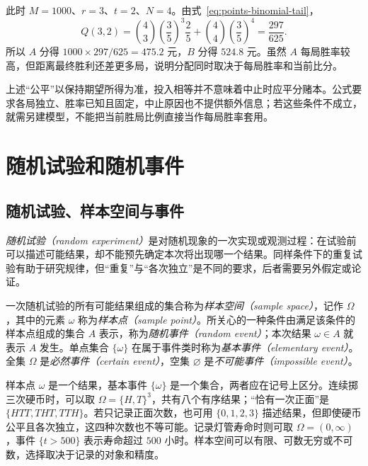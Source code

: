 \begin{solve}
此时 $M=1000$、$r=3$、$t=2$、$N=4$。由式~\eqref{eq:points-binomial-tail}，
\[
  Q(3,2)=\binom43\left(\frac35\right)^3\frac25
          +\binom44\left(\frac35\right)^4
        =\frac{297}{625}.
\]
所以 $A$ 分得 $1000\times297/625=475.2$ 元，$B$ 分得 $524.8$ 元。虽然 $A$ 每局胜率较高，但距离最终胜利还差更多局，说明分配同时取决于每局胜率和当前比分。
\end{solve}

上述“公平”以保持期望所得为准，投入相等并不意味着中止时应平分赌本。公式要求各局独立、胜率已知且固定，中止原因也不提供额外信息；若这些条件不成立，就需另建模型，不能把当前胜局比例直接当作每局胜率套用。

\section{随机试验和随机事件}
\label{sec:study-random-experiments}

\subsection{随机试验、样本空间与事件}
\label{subsec:study-sample-space}

\emph{随机试验（random experiment）}是对随机现象的一次实现或观测过程：在试验前可以描述可能结果，却不能预先确定本次将出现哪一个结果。同样条件下的重复试验有助于研究规律，但“重复”与“各次独立”是不同的要求，后者需要另外假定或论证。

\begin{definition}
\label{def:study-sample-space-event}
一次随机试验的所有可能结果组成的集合称为\emph{样本空间（sample space）}，记作 $\Omega$，其中的元素 $\omega$ 称为\emph{样本点（sample point）}。所关心的一种条件由满足该条件的样本点组成的集合 $A$ 表示，称为\emph{随机事件（random event）}；本次结果 $\omega\in A$ 就表示 $A$ 发生。单点集合 $\{\omega\}$ 在属于事件类时称为\emph{基本事件（elementary event）}。全集 $\Omega$ 是\emph{必然事件（certain event）}，空集 $\varnothing$ 是\emph{不可能事件（impossible event）}。
\end{definition}

样本点 $\omega$ 是一个结果，基本事件 $\{\omega\}$ 是一个集合，两者应在记号上区分。连续掷三次硬币时，可以取 $\Omega=\{H,T\}^{3}$，共有八个有序结果；“恰有一次正面”是 $\{HTT,THT,TTH\}$。若只记录正面次数，也可用 $\{0,1,2,3\}$ 描述结果，但即使硬币公平且各次独立，这四种次数也不等可能。记录灯管寿命时则可取 $\Omega=(0,\infty)$，事件 $\{t>500\}$ 表示寿命超过 $500$ 小时。样本空间可以有限、可数无穷或不可数，选择取决于记录的对象和精度。

